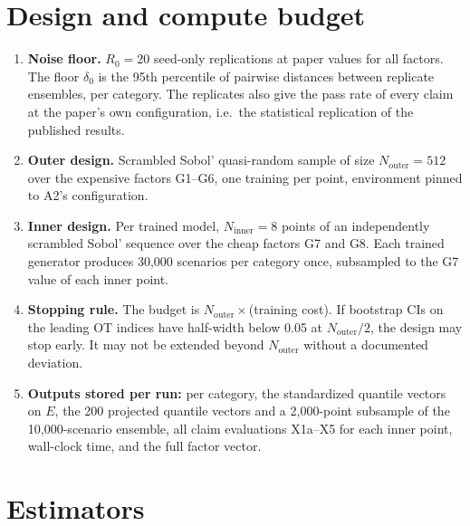 \documentclass[11pt,a4paper]{article}
\newcommand{\prop}[1]{#1}
\newcommand{\prop}[1]{\textcolor{blue}{#1}}
\begin{document}
\section{Design and compute budget}\label{sec:design}
\begin{enumerate}[nosep]
\item \textbf{Noise floor.} $R_{0}=20$ seed-only replications at paper
  values for all factors. The floor $\delta_{0}$ is the 95th percentile of
  pairwise distances between replicate ensembles, per category. \prop{The
  replicates also give the pass rate of every claim at the paper's own
  configuration, i.e.\ the statistical replication of the published
  results.}
\item \textbf{Outer design.} \prop{Scrambled} Sobol' quasi-random sample of
  size $N_{\mathrm{outer}}=512$ over the expensive factors G1--G6, one
  training per point, environment pinned to A2's configuration.
\item \textbf{Inner design.} \prop{Per trained model,
  $N_{\mathrm{inner}}=8$ points of an independently scrambled Sobol'
  sequence over the cheap factors G7 and G8. Each trained generator
  produces 30{,}000 scenarios per category once, subsampled to the G7 value
  of each inner point.}
\item \textbf{Stopping rule.} The budget is
  $N_{\mathrm{outer}}\times$(training cost). If bootstrap CIs on the
  leading OT indices have half-width below 0.05 at $N_{\mathrm{outer}}/2$,
  the design may stop early. It may not be extended beyond
  $N_{\mathrm{outer}}$ without a documented deviation.
\item \textbf{Outputs stored per run:} \prop{per category, the standardized
  quantile vectors on $E$, the 200 projected quantile vectors and a
  2{,}000-point subsample of the 10{,}000-scenario ensemble}, all claim
  evaluations X1a--X5 \prop{for each inner point}, wall-clock time, and the
  full factor vector.
\end{enumerate}

\section{Estimators}\label{sec:estimators}
\end{document}
